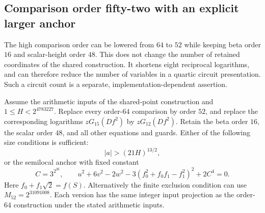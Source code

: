 \subsection{Comparison order fifty-two with an explicit larger anchor}
\label{subsec:shared-precision52}

The high comparison order can be lowered from $64$ to $52$ while
keeping beta order $16$ and scalar-height order $48$.  This does not
change the number of retained coordinates of the shared construction.
It shortens eight reciprocal logarithms, and can therefore reduce the
number of variables in a quartic circuit presentation.  Such a circuit
count is a separate, implementation-dependent assertion.

\begin{proposition}\label{prop:shared-precision52}
Assume the arithmetic inputs of the shared-point construction and
$1\le H<2^{4783227}$.  Replace every order-$64$ comparison by order
$52$, and replace the corresponding logarithms $zG_{15}(Df^2)$ by
$zG_{12}(Df^2)$.  Retain the beta order $16$, the scalar order $48$,
and all other equations and guards.  Either of the following size
conditions is sufficient:
\[
 |a|>(21H)^{13/2},
\]
or the semilocal anchor with fixed constant
\[
 C=3^{2^{26}},\qquad
 u^2+6v^2-2w^2-3(f_0^2+f_0f_1-f_1^2)^2+2C^4=0.
\]
Here $f_0+f_1\sqrt2=f(S)$.  Alternatively the finite exclusion
condition can use $M_{52}=2^{31091008}$.  Each version has the same
integer input projection as the order-$64$ construction under the
stated arithmetic inputs.
\end{proposition}

